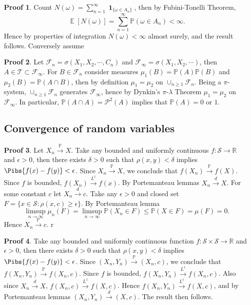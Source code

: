 \documentclass[hidelinks,11pt]{article}
\theoremstyle{definition}
\theoremstyle{dotless}
\newtheorem{prop}{Proof}[section]
\theoremstyle{remark}
\DeclareMathOperator{\E}{\mathbb{E}}
\DeclareMathOperator{\1}{\mathbf{1}}
\begin{document}
\begin{prop}
Count $N(\omega)=\sum_{n=1}^\infty\1_{\{\omega\in A_n\}}$, then by Fubini-Tonelli Theorem,
\[\E[N(\omega)]=\sum_{n=1}^\infty\mathbb{P}(\omega\in A_n)<\infty.\] Hence by properties of integration $N(\omega)<\infty$ almost surely, and the result follows.\medbreak
Conversely assume
\end{prop}

\begin{prop}
Let $\mathcal{F}_n=\sigma(X_1,X_2,\cdots,C_n)$ and $\mathcal{F}_\infty=\sigma(X_1,X_2,\cdots)$, then $A\in\mathcal{T}\subset\mathcal{F}_\infty$. For $B\in\mathcal{F}_n$ consider measures $\mu_1(B)=\mathbb{P}(A)\mathbb{P}(B)$ and $\mu_2(B)=\mathbb{P}(A\cap B)$, then by definition $\mu_1=\mu_2$ on $\cup_{n\geq1}\mathcal{F}_n$. Being a $\pi$-system, $\cup_{n\geq1}\mathcal{F}_n$ generates $\mathcal{F}_\infty$, hence by Dynkin's $\pi$-$\lambda$ Theorem $\mu_1=\mu_2$ on $\mathcal{F}_\infty$. In particular, $\mathbb{P}(A\cap A)=\mathcal{P}^2(A)$ implies that $\mathbb{P}(A)=0$ or $1$.
\end{prop}

\subsection{Convergence of random variables}

\begin{prop}
Let $X_n\xrightarrow{\mathbb{P}}X$. Take any bounded and uniformly continuous $f:\mathcal{S}\to\mathbb{R}$ and $\epsilon>0$, then there exists $\delta>0$ such that $\rho(x,y)<\delta$ implies $\Pibs{f(x)-f(y)}<\epsilon$. Since $X_n\xrightarrow{\mathbb{P}}X$, we conclude that $f(X_n)\xrightarrow{\mathbb{P}}f(X)$. Since $f$ is bounded, $f(X_n)\xrightarrow{L^1}f(x)$. By Portemanteau lemmas $X_n\xrightarrow{d}X$.\medbreak
For some constant $c$ let $X_n\xrightarrow{d}c$. Take any $\epsilon>0$ and closed set $F=\{x\in\mathcal{S}:\rho(x,c)\geq\epsilon\}$. By Portemanteau lemma
\[\limsup_{n\to\infty}\mu_n(F)=\limsup_{n\to\infty}\mathbb{P}(X_n\in F)\leq\mathbb{P}(X\in F)=\mu(F)=0.\]
Hence $X_n\xrightarrow{\mathbb{P}}c$.\medbreak
r
\end{prop}

\begin{prop}
Take any bounded and uniformly continuous function $f:\mathcal{S}\times\mathcal{S}\to\mathbb{R}$ and $\epsilon>0$, then there exists $\delta>0$ such that $\rho(x,y)<\delta$ implies $\Pibs{f(x)-f(y)}<\epsilon$. Since $(X_n,Y_n)\xrightarrow{\mathbb{P}}(X_n,c)$, we conclude that $f(X_n,Y_n)\xrightarrow{\mathbb{P}}f(X_n,c)$. Since $f$ is bounded, $f(X_n,Y_n)\xrightarrow{L^1}f(X_n,c)$. Also since $X_n\xrightarrow{d}X$, $f(X_n,c)\xrightarrow{L^1}f(X,c)$. Hence $f(X_n,Y_n)\xrightarrow{L^1}f(X,c)$, and by Portemanteau lemmas $(X_n,Y_n)\xrightarrow{d}(X,c)$. The result then follows.
\end{prop}
\end{document}
